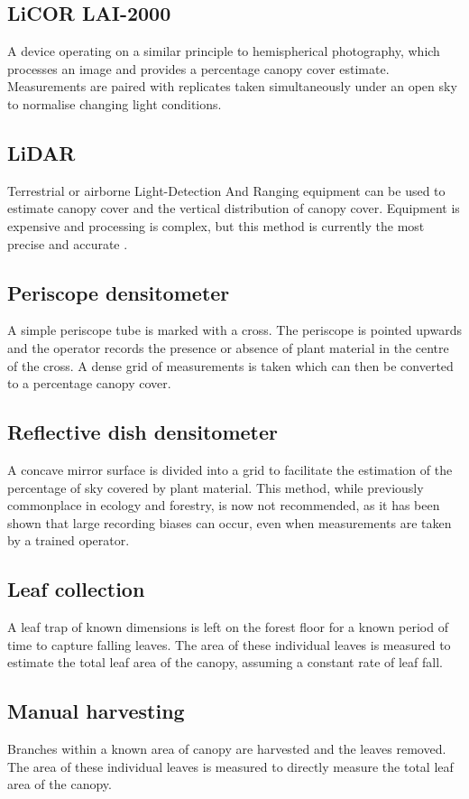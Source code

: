 \documentclass{article}
\begin{document}
\subsection{LiCOR LAI-2000}

A device operating on a similar principle to hemispherical photography, which processes an image and provides a percentage canopy cover estimate. Measurements are paired with replicates taken simultaneously under an open sky to normalise changing light conditions.

\subsection{LiDAR}

Terrestrial or airborne Light-Detection And Ranging equipment can be used to estimate canopy cover and the vertical distribution of canopy cover. Equipment is expensive and processing is complex, but this method is currently the most precise and accurate \citep{Seidel2011}.

\subsection{Periscope densitometer}

A simple periscope tube is marked with a cross. The periscope is pointed upwards and the operator records the presence or absence of plant material in the centre of the cross. A dense grid of measurements is taken which can then be converted to a percentage canopy cover.

\subsection{Reflective dish densitometer}

A concave mirror surface is divided into a grid to facilitate the estimation of the percentage of sky covered by plant material. This method, while previously commonplace in ecology and forestry, is now not recommended, as it has been shown that large recording biases can occur, even when measurements are taken by a trained operator.

\subsection{Leaf collection}

A leaf trap of known dimensions is left on the forest floor for a known period of time to capture falling leaves. The area of these individual leaves is measured to estimate the total leaf area of the canopy, assuming a constant rate of leaf fall.

\subsection{Manual harvesting}

Branches within a known area of canopy are harvested and the leaves removed. The area of these individual leaves is measured to directly measure the total leaf area of the canopy.


\printbibliography
\end{document}
